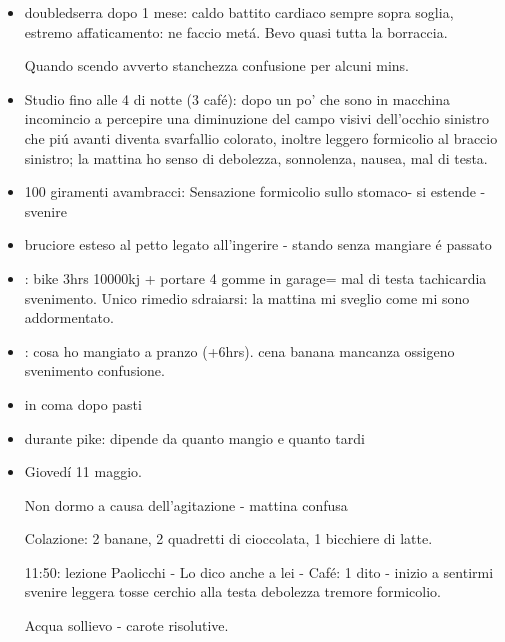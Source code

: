 \begin{itemize}

\item doubledserra dopo 1 mese: caldo battito cardiaco sempre sopra soglia, estremo affaticamento: ne faccio met\'a. Bevo quasi tutta la borraccia.

Quando scendo avverto stanchezza confusione per alcuni mins.

\item Studio fino alle 4 di notte (3 caf\'e): dopo un po' che sono in macchina incomincio a percepire una diminuzione del campo visivi dell'occhio sinistro che pi\'u avanti diventa svarfallio colorato, inoltre leggero formicolio al braccio sinistro; la mattina ho senso di debolezza, sonnolenza, nausea, mal di testa.

\item 100 giramenti avambracci: Sensazione formicolio sullo stomaco- si estende - svenire

\item bruciore esteso al petto legato all'ingerire - stando senza mangiare \'e passato

\item {}: bike 3hrs 10000kj + portare 4 gomme in garage= mal di testa tachicardia svenimento. Unico rimedio sdraiarsi: la mattina mi sveglio come mi sono addormentato.

\item {}: cosa ho mangiato a pranzo (+6hrs). cena banana mancanza ossigeno svenimento confusione.

\item in coma dopo pasti

\item {} durante pike: dipende da quanto mangio  e quanto tardi

\item {} Gioved\'i 11 maggio. 

Non dormo a causa dell'agitazione - mattina confusa 

Colazione: 2 banane, 2 quadretti di cioccolata, 1 bicchiere di latte.

11:50: lezione Paolicchi - Lo dico anche a lei - Caf\'e: 1 dito - inizio a sentirmi svenire leggera tosse cerchio alla testa debolezza tremore formicolio.

Acqua sollievo - carote risolutive.


\end{itemize}
